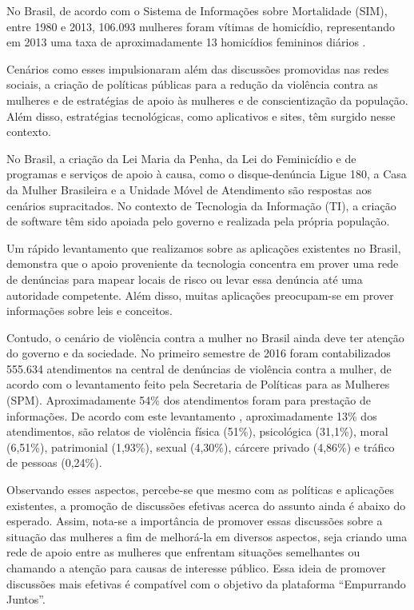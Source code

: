 No Brasil, de acordo com o Sistema de Informações sobre Mortalidade (SIM), entre 1980 e 2013, 106.093 mulheres foram vítimas de homicídio, 
representando em 2013 uma taxa de aproximadamente 13 homicídios femininos
diários \cite{mapa_violencia_2015}. 

Cenários como esses impulsionaram além das discussões promovidas nas redes sociais, a criação de políticas públicas para a redução da violência 
contra as mulheres e de estratégias de apoio às mulheres e de conscientização da população. Além disso, estratégias tecnológicas, 
como aplicativos e sites, têm surgido nesse contexto.

No Brasil, a criação da Lei Maria da Penha, da Lei do Feminicídio e de programas e serviços de apoio à causa, 
como o disque-denúncia Ligue 180, a Casa da Mulher Brasileira e a Unidade Móvel de Atendimento são respostas aos cenários supracitados. 
No contexto de Tecnologia da Informação (TI), a criação de software têm sido apoiada pelo governo e realizada pela própria população.

Um rápido levantamento que realizamos sobre as aplicações existentes no Brasil, demonstra que o apoio proveniente da tecnologia concentra em 
prover uma rede de denúncias para mapear locais de risco ou levar essa denúncia até uma autoridade competente. Além disso, muitas aplicações 
preocupam-se em prover informações sobre leis e conceitos.

Contudo, o cenário de violência contra a mulher no Brasil ainda deve ter atenção do governo e da sociedade. No primeiro semestre de 2016 
foram contabilizados 555.634 atendimentos na central de denúncias 
de violência contra a mulher, de acordo com o levantamento feito pela Secretaria de Políticas para as Mulheres (SPM). 
Aproximadamente 54\% dos atendimentos foram para prestação de informações. De acordo com este levantamento \cite{portal_180}, aproximadamente 13\% dos 
atendimentos, 
são relatos de violência física (51\%), psicológica (31,1\%), moral (6,51\%), patrimonial (1,93\%), sexual (4,30\%), cárcere privado (4,86\%) e 
tráfico de pessoas (0,24\%).

Observando esses aspectos, percebe-se que mesmo com as políticas e aplicações existentes, a promoção de discussões efetivas acerca do 
assunto ainda é abaixo do esperado. Assim, nota-se a importância de promover essas discussões sobre a situação das mulheres a fim de 
melhorá-la em diversos aspectos, seja criando uma rede de apoio entre as mulheres que enfrentam situações semelhantes ou chamando a atenção 
para causas de interesse público. Essa ideia de promover discussões mais efetivas é compatível com o objetivo da plataforma ``Empurrando Juntos''.

